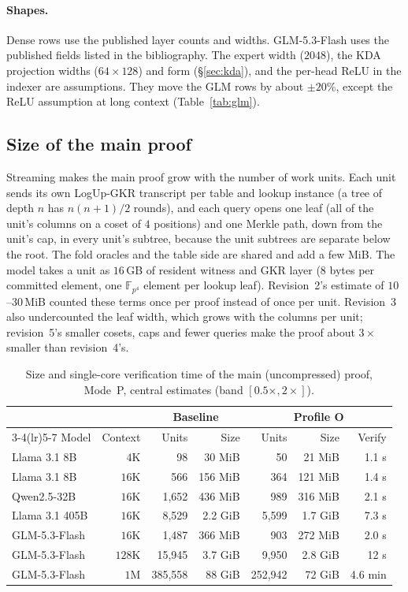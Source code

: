 \documentclass[11pt]{article}
\newcommand{\F}{\mathbb{F}}
\newcommand{\Fq}{\F_{p^4}}
\begin{document}
\paragraph{Shapes.}
Dense rows use the published layer counts and widths.
GLM-5.3-Flash uses the published fields listed in the bibliography. The expert width (\(2048\)), the KDA projection widths (\(64\times128\)) and form (\S\ref{sec:kda}), and the per-head ReLU in the indexer are assumptions.
They move the GLM rows by about \(\pm 20\%\), except the ReLU assumption at long context (Table~\ref{tab:glm}).

\subsection{Size of the main proof}
\label{sec:size}

Streaming makes the main proof grow with the number of work units.
Each unit sends its own LogUp-GKR transcript per table and lookup instance (a tree of depth \(n\) has \(n(n+1)/2\) rounds), and each query opens one leaf (all of the unit's columns on a coset of \(4\) positions) and one Merkle path, down from the unit's cap, in every unit's subtree, because the unit subtrees are separate below the root.
The fold oracles and the table side are shared and add a few MiB.
The model takes a unit as \(16\)\,GB of resident witness and GKR layer (\(8\) bytes per committed element, one \(\Fq\) element per lookup leaf).
Revision~2's estimate of \(10\)--\(30\)\,MiB counted these terms once per proof instead of once per unit.
Revision~3 also undercounted the leaf width, which grows with the columns per unit; revision~5's smaller cosets, caps and fewer queries make the proof about \(3\times\) smaller than revision~4's.

\begin{table}[h]
\centering\small
\begin{tabular}{@{}lrrrrrr@{}}
\toprule
& & \multicolumn{2}{c}{Baseline} & \multicolumn{3}{c}{Profile O} \\
\cmidrule(lr){3-4}\cmidrule(lr){5-7}
Model & Context & Units & Size & Units & Size & Verify \\
\midrule
Llama 3.1 8B & \(4\)K & 98 & 30 MiB & 50 & 21 MiB & 1.1 s \\
Llama 3.1 8B & \(16\)K & 566 & 156 MiB & 364 & 121 MiB & 1.4 s \\
Qwen2.5-32B & \(16\)K & 1{,}652 & 436 MiB & 989 & 316 MiB & 2.1 s \\
Llama 3.1 405B & \(16\)K & 8{,}529 & 2.2 GiB & 5{,}599 & 1.7 GiB & 7.3 s \\
GLM-5.3-Flash & \(16\)K & 1{,}487 & 366 MiB & 903 & 272 MiB & 2.0 s \\
GLM-5.3-Flash & \(128\)K & 15{,}945 & 3.7 GiB & 9{,}950 & 2.8 GiB & 12 s \\
GLM-5.3-Flash & \(1\)M & 385{,}558 & 88 GiB & 252{,}942 & 72 GiB & 4.6 min \\
\bottomrule
\end{tabular}
\caption{Size and single-core verification time of the main (uncompressed) proof, Mode~P, central estimates (band \([0.5\times, 2\times]\)).}
\label{tab:size}
\end{table}
\end{document}
